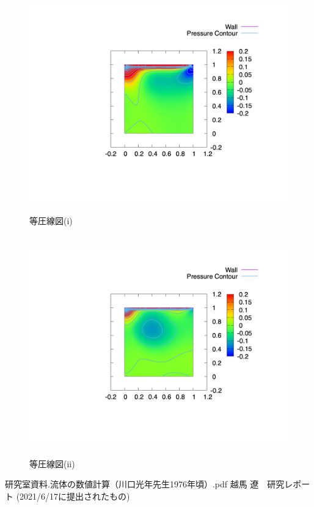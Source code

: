 \documentclass[upLaTeX,a4paper]{jsarticle}
\begin{document}
\begin{figure}[H]
  \centering
  \includegraphics[height=9.5cm, clip, trim=0 200 0 0]{outputs/img/p_re50.png}
  \caption{等圧線図(i)}
  \label{fig:p_re50}
\end{figure}
\begin{figure}[H]
  \centering
  \includegraphics[height=9.5cm, clip,trim=0 200 0 0]{outputs/img/p_re200.png}
  \caption{等圧線図(ii)}
  \label{fig:p_re200}
\end{figure}

\begin{thebibliography}{9}
   研究室資料.流体の数値計算（川口光年先生1976年頃）.pdf
   越馬 遼　研究レポート (2021/6/17に提出されたもの)
\end{thebibliography}
\end{document}
